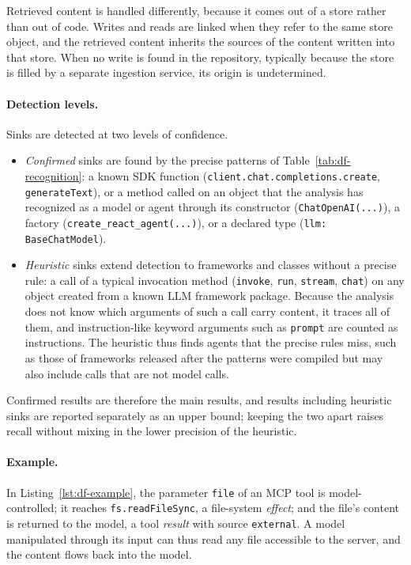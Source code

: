 Retrieved content is handled differently, because it comes out of a store rather than out of code. Writes and reads are linked when they refer to the same store object, and the retrieved content inherits the sources of the content written into that store. When no write is found in the repository, typically because the store is filled by a separate ingestion service, its origin is undetermined.
\paragraph{Detection levels.} Sinks are detected at two levels of confidence. 
\begin{itemize}
    \item \emph{Confirmed} sinks are found by the precise patterns of Table~\ref{tab:df-recognition}: a known SDK function (\texttt{client.chat.completions.create}, \texttt{generateText}), or a method called on an object that the analysis has recognized as a model or agent through its constructor (\texttt{ChatOpenAI(...)}), a factory (\texttt{create\_react\_agent(...)}), or a declared type (\texttt{llm: BaseChatModel}).
    \item \emph{Heuristic} sinks extend detection to frameworks and classes without a precise rule: a call of a typical invocation method (\texttt{invoke}, \texttt{run}, \texttt{stream}, \texttt{chat}) on any object created from a known LLM framework package. Because the analysis does not know which arguments of such a call carry content, it traces all of them, and instruction-like keyword arguments such as \texttt{prompt} are counted as instructions. The heuristic thus finds agents that the precise rules miss, such as those of frameworks released after the patterns were compiled but may also include calls that are not model calls.
\end{itemize}
Confirmed results are therefore the main results, and results including heuristic sinks are reported separately as an upper bound; keeping the two apart raises recall without mixing in the lower precision of the heuristic.

\paragraph{Example.} In Listing~\ref{lst:df-example}, the parameter \texttt{file} of an MCP tool is model-controlled; it reaches \texttt{fs.readFileSync}, a file-system \emph{effect}; and the file's content is returned to the model, a tool \emph{result} with source \texttt{external}. A model manipulated through its input can thus read any file accessible to the server, and the content flows back into the model.

